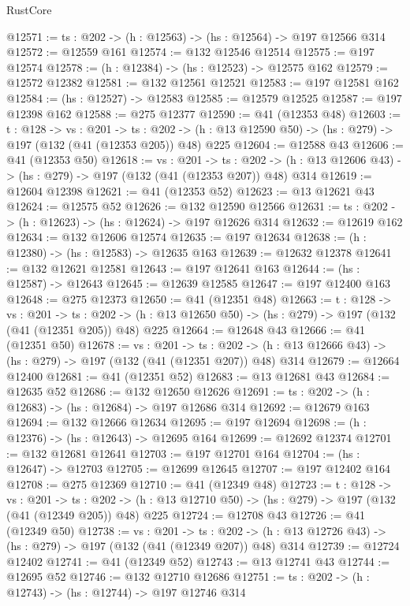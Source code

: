 \begin{lexlean}{RustCore}
\begin{coremodule}
@12571 := {ts : @202} -> (h : @12563) -> (hs : @12564) -> @197 @12566 @314
@12572 := @12559 @161
@12574 := @132 @12546 @12514
@12575 := @197 @12574
@12578 := (h : @12384) -> (hs : @12523) -> @12575 @162
@12579 := @12572 @12382
@12581 := @132 @12561 @12521
@12583 := @197 @12581 @162
@12584 := (hs : @12527) -> @12583
@12585 := @12579 @12525
@12587 := @197 @12398 @162
@12588 := @275 @12377
@12590 := @41 (@12353 @48)
@12603 := {t : @128} ->
  {vs : @201} ->
  {ts : @202} -> (h : @13 @12590 @50) -> (hs : @279) -> @197 (@132 (@41 (@12353 @205)) @48) @225
@12604 := @12588 @43
@12606 := @41 (@12353 @50)
@12618 := {vs : @201} ->
  {ts : @202} -> (h : @13 @12606 @43) -> (hs : @279) -> @197 (@132 (@41 (@12353 @207)) @48) @314
@12619 := @12604 @12398
@12621 := @41 (@12353 @52)
@12623 := @13 @12621 @43
@12624 := @12575 @52
@12626 := @132 @12590 @12566
@12631 := {ts : @202} -> (h : @12623) -> (hs : @12624) -> @197 @12626 @314
@12632 := @12619 @162
@12634 := @132 @12606 @12574
@12635 := @197 @12634
@12638 := (h : @12380) -> (hs : @12583) -> @12635 @163
@12639 := @12632 @12378
@12641 := @132 @12621 @12581
@12643 := @197 @12641 @163
@12644 := (hs : @12587) -> @12643
@12645 := @12639 @12585
@12647 := @197 @12400 @163
@12648 := @275 @12373
@12650 := @41 (@12351 @48)
@12663 := {t : @128} ->
  {vs : @201} ->
  {ts : @202} -> (h : @13 @12650 @50) -> (hs : @279) -> @197 (@132 (@41 (@12351 @205)) @48) @225
@12664 := @12648 @43
@12666 := @41 (@12351 @50)
@12678 := {vs : @201} ->
  {ts : @202} -> (h : @13 @12666 @43) -> (hs : @279) -> @197 (@132 (@41 (@12351 @207)) @48) @314
@12679 := @12664 @12400
@12681 := @41 (@12351 @52)
@12683 := @13 @12681 @43
@12684 := @12635 @52
@12686 := @132 @12650 @12626
@12691 := {ts : @202} -> (h : @12683) -> (hs : @12684) -> @197 @12686 @314
@12692 := @12679 @163
@12694 := @132 @12666 @12634
@12695 := @197 @12694
@12698 := (h : @12376) -> (hs : @12643) -> @12695 @164
@12699 := @12692 @12374
@12701 := @132 @12681 @12641
@12703 := @197 @12701 @164
@12704 := (hs : @12647) -> @12703
@12705 := @12699 @12645
@12707 := @197 @12402 @164
@12708 := @275 @12369
@12710 := @41 (@12349 @48)
@12723 := {t : @128} ->
  {vs : @201} ->
  {ts : @202} -> (h : @13 @12710 @50) -> (hs : @279) -> @197 (@132 (@41 (@12349 @205)) @48) @225
@12724 := @12708 @43
@12726 := @41 (@12349 @50)
@12738 := {vs : @201} ->
  {ts : @202} -> (h : @13 @12726 @43) -> (hs : @279) -> @197 (@132 (@41 (@12349 @207)) @48) @314
@12739 := @12724 @12402
@12741 := @41 (@12349 @52)
@12743 := @13 @12741 @43
@12744 := @12695 @52
@12746 := @132 @12710 @12686
@12751 := {ts : @202} -> (h : @12743) -> (hs : @12744) -> @197 @12746 @314

\end{coremodule}
\end{lexlean}
